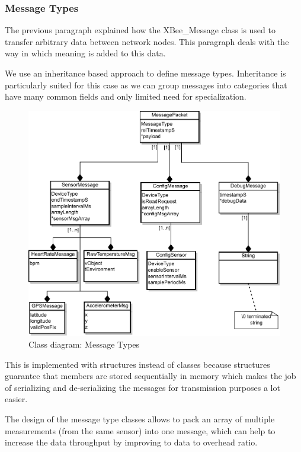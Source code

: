 \subsubsection{Message Types}
\label{sec:message_types}
The previous paragraph explained how the XBee\_Message class is used to transfer arbitrary data between network nodes. This paragraph deals with the way in which meaning is added to this data.

We use an inheritance based approach to define message types. Inheritance is particularly suited for this case as we can group messages into categories that have many common fields and only limited need for specialization.

\begin{figure}
\includegraphics[width=\textwidth]{Images/message_types}
\caption{Class diagram: Message Types}
\label{fig:msg_types}
\end{figure}

This is implemented with structures instead of classes because structures guarantee that members are stored sequentially in memory which makes the job of serializing and de-serializing the messages for transmission purposes a lot easier.

The design of the message type classes allows to pack an array of multiple measurements (from the same sensor) into one message, which can help to increase the data throughput by improving to data to overhead ratio.

